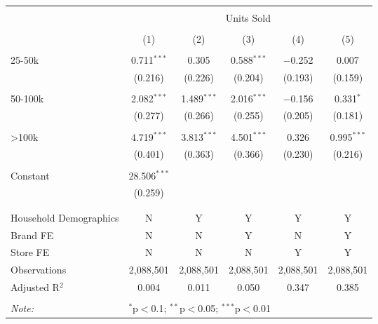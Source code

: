 
\begin{table}[!htbp] \centering 
  \caption{} 
  \label{} 
\begin{tabular}{@{\extracolsep{5pt}}lccccc} 
\\[-1.8ex]\hline 
\hline \\[-1.8ex] 
 & \multicolumn{5}{c}{Units Sold} \\ 
\cline{2-6} 
\\[-1.8ex] & (1) & (2) & (3) & (4) & (5)\\ 
\hline \\[-1.8ex] 
 25-50k & 0.711$^{***}$ & 0.305 & 0.588$^{***}$ & $-$0.252 & 0.007 \\ 
  & (0.216) & (0.226) & (0.204) & (0.193) & (0.159) \\ 
  & & & & & \\ 
 50-100k & 2.082$^{***}$ & 1.489$^{***}$ & 2.016$^{***}$ & $-$0.156 & 0.331$^{*}$ \\ 
  & (0.277) & (0.266) & (0.255) & (0.205) & (0.181) \\ 
  & & & & & \\ 
 >100k & 4.719$^{***}$ & 3.813$^{***}$ & 4.501$^{***}$ & 0.326 & 0.995$^{***}$ \\ 
  & (0.401) & (0.363) & (0.366) & (0.230) & (0.216) \\ 
  & & & & & \\ 
 Constant & 28.506$^{***}$ &  &  &  &  \\ 
  & (0.259) &  &  &  &  \\ 
  & & & & & \\ 
\hline \\[-1.8ex] 
Household Demographics & N & Y & Y & Y & Y \\ 
Brand FE & N & N & Y & N & Y \\ 
Store FE & N & N & N & Y & Y \\ 
Observations & 2,088,501 & 2,088,501 & 2,088,501 & 2,088,501 & 2,088,501 \\ 
Adjusted R$^{2}$ & 0.004 & 0.011 & 0.050 & 0.347 & 0.385 \\ 
\hline 
\hline \\[-1.8ex] 
\textit{Note:}  & \multicolumn{5}{l}{$^{*}$p$<$0.1; $^{**}$p$<$0.05; $^{***}$p$<$0.01} \\ 
\end{tabular} 
\end{table} 
